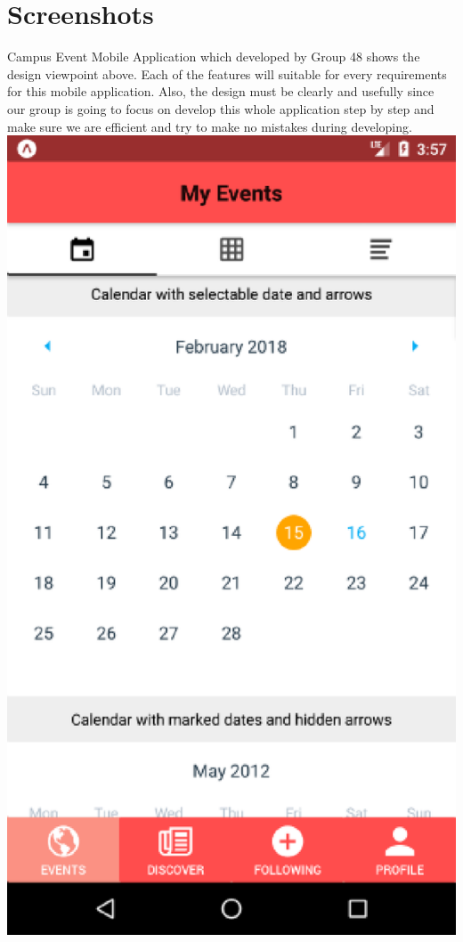 \documentclass[letterpaper, 10pt,titlepage]{article}
\begin{document}
\section{Screenshots}
Campus Event Mobile Application which developed by Group 48 shows the design viewpoint above. Each of the features will suitable for every requirements for this mobile application. Also, the design must be clearly and usefully since our group is going to focus on develop this whole application step by step and make sure we are efficient and try to make no mistakes during developing. 
\newpage
\includegraphics{Calendar_View.eps}
\end{document}
